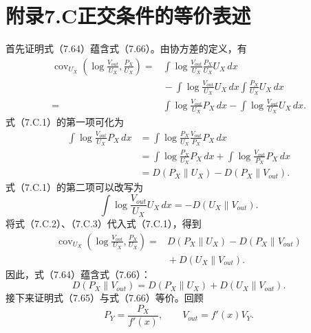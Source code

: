 \section*{附录7.C\quad 正交条件的等价表述}

首先证明式（7.64）蕴含式（7.66）。由协方差的定义，有
\begin{equation}
\begin{aligned}
\operatorname{cov}_{U_X}\left(\log\frac{V_{out}}{U_X},\frac{P_X}{U_X}\right)
={}&\int\log\frac{V_{out}}{U_X}\frac{P_X}{U_X}U_X\,dx\\
&{}-\int\log\frac{V_{out}}{U_X}U_X\,dx
 \int\frac{P_X}{U_X}U_X\,dx\\
={}&\int\log\frac{V_{out}}{U_X}P_X\,dx
 -\int\log\frac{V_{out}}{U_X}U_X\,dx.
\end{aligned}\tag{7.C.1}
\end{equation}
式（7.C.1）的第一项可化为
\begin{equation}
\begin{aligned}
\int\log\frac{V_{out}}{U_X}P_X\,dx
 &=\int\log\frac{P_X}{U_X}\frac{V_{out}}{P_X}P_X\,dx\\
 &=\int\log\frac{P_X}{U_X}P_X\,dx
   +\int\log\frac{V_{out}}{P_X}P_X\,dx\\
 &=D(P_X\parallel U_X)-D(P_X\parallel V_{out}).
\end{aligned}\tag{7.C.2}
\end{equation}
式（7.C.1）的第二项可以改写为
\begin{equation}
\int\log\frac{V_{out}}{U_X}U_X\,dx=-D(U_X\parallel V_{out}).\tag{7.C.3}
\end{equation}
将式（7.C.2）、（7.C.3）代入式（7.C.1），得到
\begin{equation}
\begin{aligned}
\operatorname{cov}_{U_X}\left(\log\frac{V_{out}}{U_X},\frac{P_X}{U_X}\right)
={}&D(P_X\parallel U_X)-D(P_X\parallel V_{out})\\
&{}+D(U_X\parallel V_{out}).
\end{aligned}\tag{7.C.4}
\end{equation}
因此，式（7.64）蕴含式（7.66）：
\begin{equation}
D(P_X\parallel V_{out})=D(P_X\parallel U_X)+D(U_X\parallel V_{out}).\tag{7.C.5}
\end{equation}
接下来证明式（7.65）与式（7.66）等价。回顾
\begin{equation}
P_Y=\frac{P_X}{f'(x)},\qquad V_{out}=f'(x)V_Y.\tag{7.C.6}
\end{equation}
